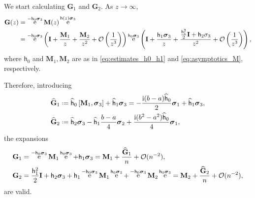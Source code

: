 \documentclass[reqno,a4paper,11pt]{amsart}
\DeclareMathOperator{\ee}{\rm e}
\newcommand{\Boh}{\mathcal{O}}
\newcommand{\ii}{\mathrm{i}}
\renewcommand{\bm}{\mathbf}
\newcommand{\msf}{\mathsf}
\newcommand{\wh}{\widehat}
\renewcommand{\sp}{\boldsymbol \sigma}
\theoremstyle{definition}
\theoremstyle{remark}
\numberwithin{equation}{section}
\newcommand*{\defeq}{\mathrel{\vcenter{\baselineskip0.5ex \lineskiplimit0pt
                     \hbox{\scriptsize.}\hbox{\scriptsize.}}}%
                     =}
\begin{document}
    We start calculating $\bm G_1$ and $\bm G_2$. As $z \to \infty$,
    \[\begin{split}
        \bm G(z) 
        &= \ee^{- \msf h_0 \sp_3} \bm M (z) \ee^{\msf h(z) \sp_3} \\
        &= \ee^{- \msf h_0 \sp_3} \left( \bm I + \frac{\bm M_1}{z} + \frac{\bm M_2}{z^2} + \Boh\left( \frac{1}{z^3}\right)\right) \ee^{\msf h_0 \sp_3} \left( \bm I + \frac{\msf h_1 \sp_3 }{z} + \frac{ \frac{\msf h_1^2}{2} \bm I + \msf h_2 \bm \sigma_3 }{z^2} + \Boh \left( \frac{1}{z^3}\right)\right),
    \end{split}\]
    where $\msf h_0$ and $\bm M_1,\bm M_2$ are as in \eqref{eq:estimates_h0_h1} and \eqref{eq:asymptotics_M}, respectively.
    
    Therefore, introducing
    \begin{equation}\label{deff:hatG1hatG2}
    \begin{aligned}
        \widehat{\bm G}_1 &\defeq \widehat{\msf h}_0\, [\bm M_1, \sp_3] + \widehat{\msf h}_1 \sp_3 = -\frac{\ii (b-a)\wh{\msf h}_0}{2}\sp_1 + \wh{\msf h}_1\sp_3, \\
        \widehat{\bm G}_2 &\defeq \widehat{\msf h}_2 \sp_3 - \widehat{\msf h}_1 \frac{b-a}{4} \sp_2 +  \frac{\ii(b^2-a^2)\widehat{\msf h}_0}{4}  \sp_1,
    \end{aligned}
    \end{equation}
    the expansions
    \begin{equation}\label{deff:G1G2}
    \begin{aligned}
        \bm G_1 
            &= \ee^{- \msf h_0 \sp_3} \bm M_1 \ee^{\msf h_0 \sp_3} +  \msf h_1 \sp_3 
            = \bm M_1 + \frac{\widehat{\bm G}_1}{n} + \Boh(n^{-2}), \\
        \bm G_2 
            &= \frac{\msf h_1^2}{2}\bm I+\msf h_2\sp_3+\msf h_1\ee^{-\msf h_0\sp_3}\bm M_1\ee^{\msf h_0\sp_3}+\ee^{-\msf h_0\sp_3}\bm M_2\ee^{\msf h_0\sp_3} 
            = \bm M_2 + \frac{\widehat{\bm G}_2}{n} + \Boh(n^{-2}),
    \end{aligned}
    \end{equation}
    are valid.
  
\end{document}
